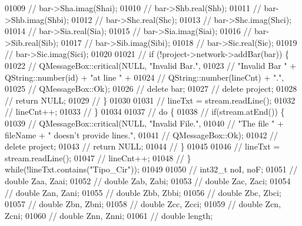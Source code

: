 \begin{DoxyCode}
01009 \textcolor{comment}{//    bar->Sha.imag(Shai);}
01010 \textcolor{comment}{//    bar->Shb.real(Shb);}
01011 \textcolor{comment}{//    bar->Shb.imag(Shbi);}
01012 \textcolor{comment}{//    bar->Shc.real(Shc);}
01013 \textcolor{comment}{//    bar->Shc.imag(Shci);}
01014 \textcolor{comment}{//    bar->Sia.real(Sia);}
01015 \textcolor{comment}{//    bar->Sia.imag(Siai);}
01016 \textcolor{comment}{//    bar->Sib.real(Sib);}
01017 \textcolor{comment}{//    bar->Sib.imag(Sibi);}
01018 \textcolor{comment}{//    bar->Sic.real(Sic);}
01019 \textcolor{comment}{//    bar->Sic.imag(Sici);}
01020 
01021 \textcolor{comment}{//    if (!project->network->addBar(bar)) \{}
01022 \textcolor{comment}{//      QMessageBox::critical(NULL, "Invalid Bar.",}
01023 \textcolor{comment}{//                            "Invalid Bar " + QString::number(id) + "at line " +}
01024 \textcolor{comment}{//                            QString::number(lineCnt) + ".",}
01025 \textcolor{comment}{//                            QMessageBox::Ok);}
01026 \textcolor{comment}{//      delete bar;}
01027 \textcolor{comment}{//      delete project;}
01028 \textcolor{comment}{//      return NULL;}
01029 \textcolor{comment}{//    \}}
01030 
01031 \textcolor{comment}{//    lineTxt = stream.readLine();}
01032 \textcolor{comment}{//    lineCnt++;}
01033 \textcolor{comment}{//  \}}
01034 
01037 \textcolor{comment}{//  do \{}
01038 \textcolor{comment}{//    if(stream.atEnd()) \{}
01039 \textcolor{comment}{//      QMessageBox::critical(NULL, "Invalid File.",}
01040 \textcolor{comment}{//                            "The file " + fileName + " doesn't provide lines.",}
01041 \textcolor{comment}{//                            QMessageBox::Ok);}
01042 \textcolor{comment}{//      delete project;}
01043 \textcolor{comment}{//      return NULL;}
01044 \textcolor{comment}{//    \}}
01045 
01046 \textcolor{comment}{//    lineTxt = stream.readLine();}
01047 \textcolor{comment}{//    lineCnt++;}
01048 \textcolor{comment}{//  \} while(!lineTxt.contains("Tipo\_Cir"));}
01049 
01050 \textcolor{comment}{//  int32\_t noI, noF;}
01051 \textcolor{comment}{//  double Zaa, Zaai;}
01052 \textcolor{comment}{//  double Zab, Zabi;}
01053 \textcolor{comment}{//  double Zac, Zaci;}
01054 \textcolor{comment}{//  double Zan, Zani;}
01055 \textcolor{comment}{//  double Zbb, Zbbi;}
01056 \textcolor{comment}{//  double Zbc, Zbci;}
01057 \textcolor{comment}{//  double Zbn, Zbni;}
01058 \textcolor{comment}{//  double Zcc, Zcci;}
01059 \textcolor{comment}{//  double Zcn, Zcni;}
01060 \textcolor{comment}{//  double Znn, Znni;}
01061 \textcolor{comment}{//  double length;}

\end{DoxyCode}

